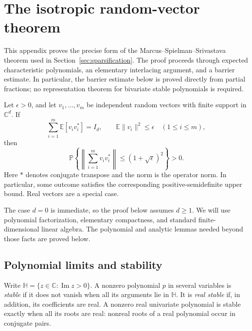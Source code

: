 \section{The isotropic random-vector theorem}
\label{sec:mss}

This appendix proves the precise form of the Marcus--Spielman--Srivastava
theorem used in Section~\ref{sec:sparsification}.  The proof proceeds
through expected characteristic polynomials, an elementary interlacing
argument, and a barrier estimate.  In particular, the barrier estimate
below is proved directly from partial fractions; no representation
theorem for bivariate stable polynomials is required.

\begin{theorem}
\label{thm:mss}
Let $\epsilon>0$, and let $v_1,\ldots,v_m$ be independent random vectors
with finite support in $\mathbb C^d$.  If
\begin{equation}
 \sum_{i=1}^m\mathbb E[v_iv_i^*]=I_d,
 \qquad \mathbb E\|v_i\|^2\leq\epsilon\quad(1\leq i\leq m),
 \label{eq:mss-hypotheses}
\end{equation}
then
\begin{equation}
 \mathbb P\left\{
 \left\|\sum_{i=1}^m v_iv_i^*\right\|
       \leq(1+\sqrt\epsilon)^2\right\}>0.
 \label{eq:mss-conclusion}
\end{equation}
Here $*$ denotes conjugate transpose and the norm is the operator norm.
In particular, some outcome satisfies the corresponding
positive-semidefinite upper bound.  Real vectors are a special case.
\end{theorem}

The case $d=0$ is immediate, so the proof below assumes $d\geq1$.
We will use polynomial factorization, elementary compactness, and
standard finite-dimensional linear algebra.  The polynomial and
analytic lemmas needed beyond those facts are proved below.

\subsection{Polynomial limits and stability}

Write $\mathbb H=\{z\in\mathbb C:\operatorname{Im}z>0\}$.
A nonzero polynomial $p$ in several variables is \emph{stable} if it
does not vanish when all its arguments lie in $\mathbb H$.  It is
\emph{real stable} if, in addition, its coefficients are real.
A nonzero real univariate polynomial is stable exactly when all its
roots are real: nonreal roots of a real polynomial occur in conjugate
pairs.

